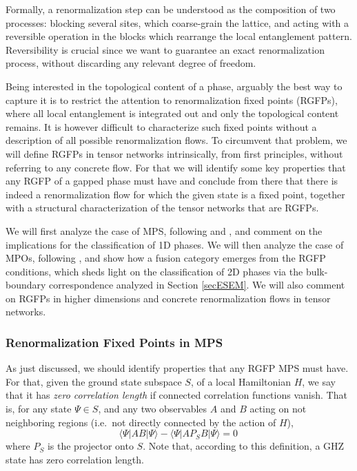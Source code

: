 \documentclass[rmp,aps,reprint,superscriptaddress,nobalancelastpage]{revtex4-1}
\newcommand{\be}{\begin{equation}}
\newcommand{\ee}{\end{equation}}
\begin{document}
Formally, a renormalization step can be understood as the composition of two processes:  blocking several sites, which coarse-grain the lattice, and acting with a reversible operation in the blocks which rearrange the local entanglement pattern. Reversibility is crucial since we want to guarantee an exact renormalization process, without discarding any relevant degree of freedom.

Being interested in the topological content of a phase, arguably the best way to capture it is to restrict the attention to renormalization fixed points (RGFPs), where all local entanglement is integrated out and only the topological content remains.
It is however difficult to characterize such fixed points without a description of all possible renormalization flows. To circumvent that problem, we will define RGFPs in tensor networks intrinsically, from first principles, without referring to any concrete flow.
For that we will identify some key properties that any RGFP of a gapped phase must have and conclude from there that there is indeed a renormalization flow for which the given state is a fixed point, together with a structural characterization of the tensor networks that are RGFPs.

We will first analyze the case of MPS, following \citet{verstraete:renorm-MPS} and \citet{cirac:mpdo-rgfp}, and comment on the implications for the classification of 1D phases. We will then analyze the case of MPOs, following \citet{cirac:mpdo-rgfp}, and show how a fusion category emerges from the RGFP conditions, which sheds light on the classification of 2D phases via the bulk-boundary correspondence analyzed in Section \ref{secESEM}. We will also  comment on RGFPs in higher dimensions and concrete renormalization flows in tensor networks.


\subsubsection{Renormalization Fixed Points in MPS \label{RFPinMPS}}

As just discussed, we should identify properties that any RGFP MPS must have. For that, given the ground state subspace $S$, of a local Hamiltonian $H$, we say that it has \emph{zero correlation length} if connected correlation functions vanish. That is, for any state $\Psi\in S$, and any two observables $A$ and $B$ acting on not neighboring regions (i.e.\ not directly connected by the action of $H$),
\be
    \langle \Psi|A B|\Psi\rangle- \langle \Psi|A P_S B|\Psi\rangle=0
    \,
\ee
where $P_S$ is the projector onto $S$. Note that, according to this definition, a GHZ state has zero correlation length.
\end{document}
